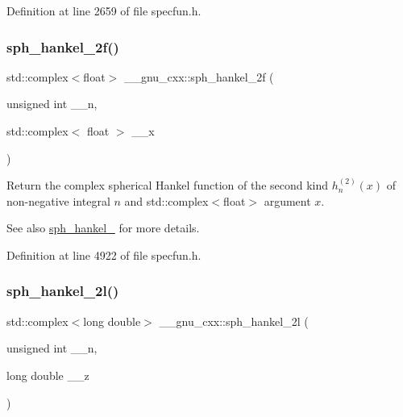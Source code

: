 Definition at line 2659 of file specfun.\+h.

\mbox{\label{group__gnu__math__spec__func_ga4c3194b71831b265811f987cbbf6e031}} 
\subsubsection{\texorpdfstring{sph\+\_\+hankel\+\_\+2f()}{sph\_hankel\_2f()}\hspace{0.1cm}{\footnotesize\ttfamily [2/2]}}
{\footnotesize\ttfamily std\+::complex$<$float$>$ \+\_\+\+\_\+gnu\+\_\+cxx\+::sph\+\_\+hankel\+\_\+2f (\begin{DoxyParamCaption}\item[{unsigned int}]{\+\_\+\+\_\+n,  }\item[{std\+::complex$<$ float $>$}]{\+\_\+\+\_\+x }\end{DoxyParamCaption})\hspace{0.3cm}{\ttfamily [inline]}}

Return the complex spherical Hankel function of the second kind $ h^{(2)}_n(x) $ of non-\/negative integral $ n $ and {\ttfamily std\+::complex$<$float$>$} argument $ x $.

\begin{DoxySeeAlso}{See also}
\hyperlink{group__gnu__math__spec__func_ga1ca08866a25e3637b04c57ff5a0c36a5}{sph\+\_\+hankel\+\_} for more details. 
\end{DoxySeeAlso}


Definition at line 4922 of file specfun.\+h.

\mbox{\label{group__gnu__math__spec__func_ga6d3ead73a4f0bfeeb0aa1fd99daaf3b1}} 
\subsubsection{\texorpdfstring{sph\+\_\+hankel\+\_\+2l()}{sph\_hankel\_2l()}\hspace{0.1cm}{\footnotesize\ttfamily [1/2]}}
{\footnotesize\ttfamily std\+::complex$<$long double$>$ \+\_\+\+\_\+gnu\+\_\+cxx\+::sph\+\_\+hankel\+\_\+2l (\begin{DoxyParamCaption}\item[{unsigned int}]{\+\_\+\+\_\+n,  }\item[{long double}]{\+\_\+\+\_\+z }\end{DoxyParamCaption})\hspace{0.3cm}{\ttfamily [inline]}}

